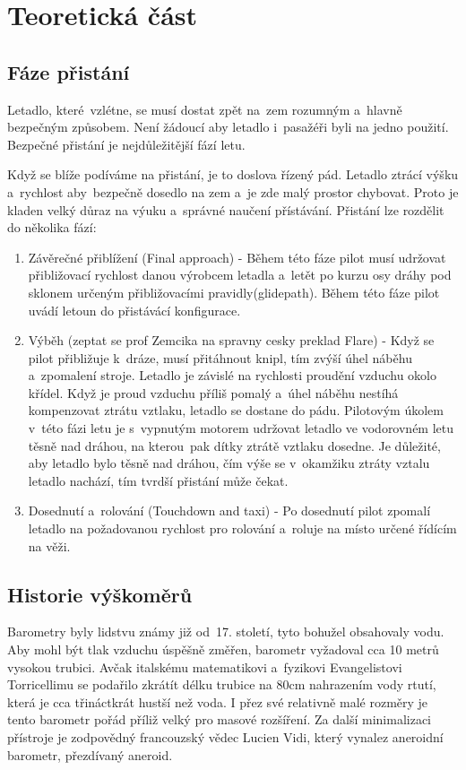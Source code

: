 \chapter{Teoretická část}
	\section{Fáze přistání}
		Letadlo, které~vzlétne, se musí dostat zpět na~zem rozumným a~hlavně bezpečným způsobem. Není žádoucí aby letadlo i~pasažéři byli na jedno použití. Bezpečné přistání je nejdůležitější fází letu.\par
		Když se blíže podíváme na přistání, je to doslova řízený pád. Letadlo ztrácí výšku a~rychlost aby~bezpečně dosedlo na zem a~je zde malý prostor chybovat. Proto je kladen velký důraz na výuku a~správné naučení přístávání. Přistání lze rozdělit do několika fází\cite{landingPhases}:
		
		\begin{enumerate}
			\item Závěrečné přiblížení (Final approach) - Během této fáze pilot musí udržovat přibližovací rychlost danou výrobcem letadla a~letět po kurzu osy dráhy pod sklonem určeným přibližovacími pravidly(glidepath).
			Během této fáze pilot uvádí letoun do přistávácí konfigurace.
			
			\item Výběh (zeptat se prof Zemcika na spravny cesky preklad Flare) - Když se pilot přibližuje k~dráze, musí přitáhnout knipl, tím zvýší úhel náběhu a~zpomalení stroje. Letadlo je závislé na rychlosti proudění vzduchu okolo křídel. Když je proud vzduchu příliš pomalý a~úhel náběhu nestíhá kompenzovat ztrátu vztlaku, letadlo se dostane do pádu. Pilotovým úkolem v~této fázi letu je s~vypnutým motorem udržovat letadlo ve vodorovném letu těsně nad dráhou, na kterou~pak dítky ztrátě vztlaku dosedne. Je důležité, aby letadlo bylo těsně nad dráhou, čím výše se v~okamžiku ztráty vztalu letadlo nachází, tím tvrdší přistání může čekat.
			
			\item Dosednutí a~rolování (Touchdown and taxi) - Po dosednutí pilot zpomalí letadlo na požadovanou rychlost pro rolování a~roluje na místo určené řídícím na věži. 
		\end{enumerate}
		
	\section{Historie výškoměrů}\label{teorie::historieVyskomeru}
		Barometry byly lidstvu známy již od~17. století, tyto bohužel obsahovaly vodu. Aby mohl být tlak vzduchu úspěšně změřen, barometr vyžadoval cca 10 metrů vysokou trubici. Avčak italskému matematikovi a~fyzikovi Evangelistovi Torricellimu se podařilo zkrátít délku trubice na 80cm nahrazením vody rtutí, která je cca třináctkrát hustší než voda. I přez své relativně malé rozměry je tento barometr pořád příliž velký pro masové rozšíření. Za další minimalizaci přístroje je zodpovědný francouzský vědec Lucien Vidi, který vynalez aneroidní barometr, přezdívaný aneroid\cite{history::aneroid}.\par
		

